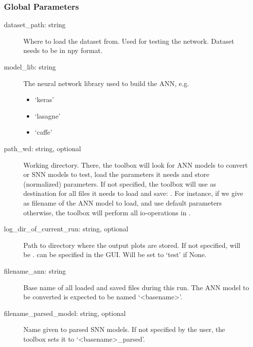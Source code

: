 \documentclass[letterpaper,10pt,english]{sphinxmanual}
\begin{document}
\subsubsection{Global Parameters}
\label{configure_toolbox:global-parameters}\begin{description}
\item[{dataset\_path: string}] \leavevmode
Where to load the dataset from. Used for testing the network. Dataset needs
to be in npy format.

\item[{model\_lib: string}] \leavevmode
The neural network library used to build the ANN, e.g.
\begin{itemize}
\item {} 
`keras'

\item {} 
`lasagne'

\item {} 
`caffe'

\end{itemize}

\item[{path\_wd: string, optional}] \leavevmode
Working directory. There, the toolbox will look for ANN models to convert
or SNN models to test, load the parameters it needs and store (normalized)
parameters.
If not specified, the toolbox will use as destination for all files it
needs to load and save:
.
For instance, if we give  as filename of the ANN model to load,
and use default parameters otherwise, the toolbox will perform all
io-operations in .

\item[{log\_dir\_of\_current\_run: string, optional}] \leavevmode
Path to directory where the output plots are stored. If not specified, will
be .  can be specified in the
GUI. Will be set to `test' if None.

\item[{filename\_ann: string}] \leavevmode
Base name of all loaded and saved files during this run. The ANN model to
be converted is expected to be named `\textless{}basename\textgreater{}'.

\item[{filename\_parsed\_model: string, optional}] \leavevmode
Name given to parsed SNN models. If not specified by the user, the
toolbox sets it to `\textless{}basename\textgreater{}\_parsed'.


\end{description}
\end{document}
